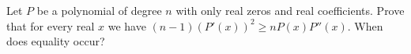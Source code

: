 Let \(P\) be a polynomial of degree \(n\) with only real zeros and real coefficients.
Prove that for every real \(x\) we have \((n-1)(P'(x))^2\ge nP(x)P''(x)\). When does equality occur?